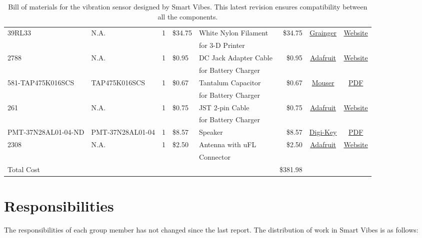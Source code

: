 \documentclass[12pt]{article}
\begin{document}
\begin{table}[H]
{\begin{tabular}{l|l|c|l|l|r|c|c}
    	 39RL33 & N.A. & 1 & \$34.75 & White Nylon Filament & \$34.75 & \href{https://www.grainger.com/product/FILABOT-White-Filament-39RL33}{Grainger} & \href{https://www.grainger.com/product/FILABOT-White-Filament-39RL33}{Website} \\
    	 & & & & for 3-D Printer & & \\
    	 2788 & N.A. & 1 & \$0.95 & DC Jack Adapter Cable & \$0.95 & \href{https://www.adafruit.com/products/2788}{Adafruit} & \href{https://www.adafruit.com/products/2788}{Website} \\
    	 & & & & for Battery Charger & & & \\
    	 581-TAP475K016SCS & TAP475K016SCS & 1 & \$0.67 & Tantalum Capacitor & \$0.67 & \href{http://www.mouser.com/ProductDetail/AVX/TAP475K016SCS/?qs=sGAEpiMZZMtZ1n0r9vR22d\%252b8XmbM9QM8L4TTXY3LGQ8\%3d}{Mouser} & \href{http://www.mouser.com/ds/2/40/tap-776819.pdf}{PDF} \\
    	 & & & & for Battery Charger & & & \\
    	 261 & N.A. & 1 & \$0.75 & JST 2-pin Cable & \$0.75 & \href{https://www.adafruit.com/product/261}{Adafruit} & \href{https://www.adafruit.com/product/261}{Website} \\
    	 & & & & for Battery Charger & & & \\
    	 	PMT-37N28AL01-04-ND & PMT-37N28AL01-04 & 1 & \$8.57 & Speaker & \$8.57 & \href{http://www.digikey.com/product-detail/en/peerless-by-tymphany/PMT-37N28AL01-04/PMT-37N28AL01-04-ND/6211115}{Digi-Key} & \href{http://www.tymphany.com/wp-content/themes/pathfinders/cache/pdfs/PMT-37N28AL01-04.pdf}{PDF} \\
        2308 & N.A. & 1 & \$2.50 & Antenna with uFL & \$2.50 & \href{https://www.adafruit.com/products/2308}{Adafruit} & \href{https://www.adafruit.com/products/2308}{Website} \\
    	 & & & & Connector & & & \\ \hline
    	Total Cost & & & & & \$381.98 &
	\end{tabular}%
	}
    \caption{Bill of materials for the vibration sensor designed by Smart Vibes. This latest revision ensures compatibility between all the components.}
    \label{tab:bom}
\end{table}

\section{Responsibilities}
The responsibilities of each group member has not changed since the last report. The distribution of work in Smart Vibes is as follows:\\
\end{document}
